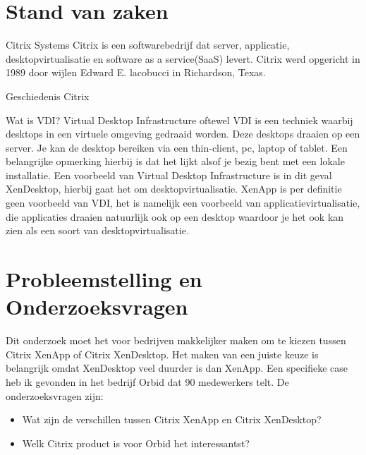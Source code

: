\section{Stand van zaken}
\label{sec:stand-van-zaken}


Citrix Systems
Citrix is een softwarebedrijf dat server, applicatie, desktopvirtualisatie en software as a service(SaaS) levert. Citrix werd opgericht in 1989 door wijlen Edward E. lacobucci in Richardson, Texas.

Geschiedenis Citrix




Wat is VDI?
Virtual Desktop Infrastructure oftewel VDI is een techniek waarbij desktops in een virtuele omgeving gedraaid worden. Deze desktops draaien op een server. Je kan de desktop bereiken via een thin-client, pc, laptop of tablet. Een belangrijke opmerking hierbij is dat het lijkt alsof je bezig bent met een lokale installatie. Een voorbeeld van Virtual Desktop Infrastructure is in dit geval XenDesktop, hierbij gaat het om desktopvirtualisatie. XenApp is per definitie geen voorbeeld van VDI, het is namelijk een voorbeeld van applicatievirtualisatie, die applicaties draaien natuurlijk ook op een desktop waardoor je het ook kan zien als een soort van desktopvirtualisatie.

\section{Probleemstelling en Onderzoeksvragen}
\label{sec:onderzoeksvragen}

Dit onderzoek moet het voor bedrijven makkelijker maken om te kiezen tussen Citrix XenApp of Citrix XenDesktop. Het maken van een juiste keuze is belangrijk omdat XenDesktop veel duurder is dan XenApp. Een specifieke case heb ik gevonden in het bedrijf Orbid dat 90 medewerkers telt. De onderzoeksvragen zijn:

\begin{itemize}
\item Wat zijn de verschillen tussen Citrix XenApp en Citrix XenDesktop?
\item Welk Citrix product is voor Orbid het interessantst?
\end{itemize}


